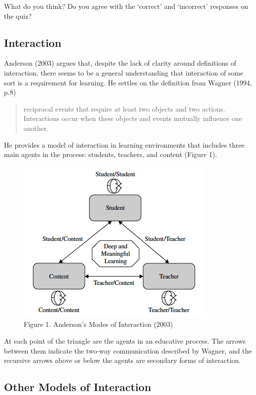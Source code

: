\documentclass[
]{book}
\begin{document}
What do you think? Do you agree with the `correct' and `incorrect' responses on the quiz?

\hypertarget{interaction}{%
\subsection*{Interaction}\label{interaction}}

Anderson (2003) argues that, despite the lack of clarity around definitions of interaction, there seems to be a general understanding that interaction of some sort is a requirement for learning. He settles on the definition from Wagner (1994, p.8)

\begin{quote}
reciprocal events that require at least two objects and two actions. Interactions occur when these objects and events mutually influence one another.
\end{quote}

He provides a model of interaction in learning environments that includes three main agents in the process: students, teachers, and content (Figure 1).

\begin{figure}
\centering
\includegraphics{assets/u2/Modes-Interaction-Anderson.png}
\caption{Figure 1. Anderson's Modes of Interaction (2003)}
\end{figure}

At each point of the triangle are the agents in an educative process. The arrows between them indicate the two-way communication described by Wagner, and the recursive arrows above or below the agents are secondary forms of interaction.

\hypertarget{other-models-of-interaction}{%
\subsection*{Other Models of Interaction}\label{other-models-of-interaction}}
\end{document}
